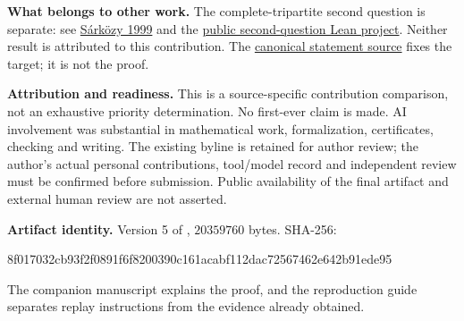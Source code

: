 \documentclass[10pt,letterpaper]{article}
\begin{document}
\textbf{What belongs to other work.} The complete-tripartite second question is separate: see \href{https://web.cs.wpi.edu/~gsarkozy/Cikkek/12.pdf}{Sárközy 1999} and the \href{https://github.com/baobingzhang/jsp-000734-erdos883-lean}{public second-question Lean project}. Neither result is attributed to this contribution. The \href{https://github.com/google-deepmind/formal-conjectures/blob/89294ea02bd7cd678d59984add52cb4baef3dbf4/FormalConjectures/ErdosProblems/883.lean}{canonical statement source} fixes the target; it is not the proof.

\textbf{Attribution and readiness.} This is a source-specific contribution comparison, not an exhaustive priority determination. No first-ever claim is made. AI involvement was substantial in mathematical work, formalization, certificates, checking and writing. The existing byline is retained for author review; the author's actual personal contributions, tool/model record and independent review must be confirmed before submission. Public availability of the final artifact and external human review are not asserted.

\textbf{Artifact identity.} Version 5 of , $20359760$ bytes. SHA-256:
\begin{center}\small\ttfamily
8f017032cb93f2f0891f6f8200390c161acabf112dac72567462e642b91ede95
\end{center}
The companion manuscript explains the proof, and the reproduction guide separates replay instructions from the evidence already obtained.
\end{document}
